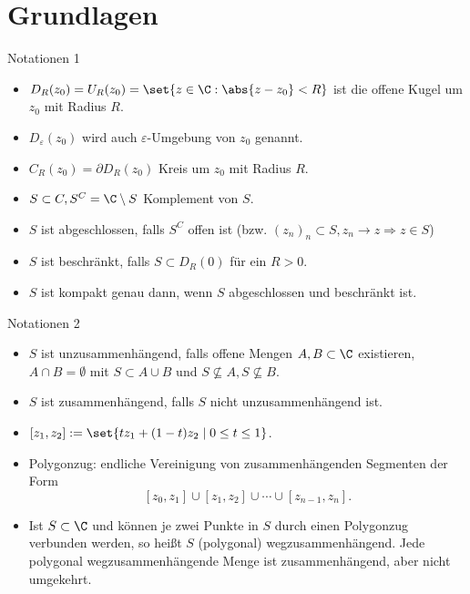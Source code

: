\section{Grundlagen}

\begin{karte}{Notationen 1}
    \begin{itemize}
        \item \(D_R(z_0) = U_R(z_0) = \set{z\in \C : \abs{z-z_0} < R}\) ist 
        die offene Kugel um \(z_0\) mit Radius \(R\).
        \item \(D_\varepsilon(z_0)\) wird auch \(\varepsilon\)-Umgebung von \(z_0\) genannt.
        \item \(C_R(z_0) = \partial D_R(z_0)\) Kreis um \(z_0\) mit Radius \(R\).
        \item \(S \subset C, S^C = \C \setminus S\) Komplement von \(S\).
        \item \(S\) ist abgeschlossen, falls \(S^C\) offen ist (bzw. \((z_n)_n \subset S, z_n \rightarrow z \Rightarrow z\in S\))
        \item \(S\) ist beschränkt, falls \(S \subset D_R(0)\) für ein \(R > 0\).
        \item \(S\) ist kompakt genau dann, wenn \(S\) abgeschlossen und beschränkt ist.
    \end{itemize}
\end{karte}

\begin{karte}{Notationen 2}
    \begin{itemize}
        \item \(S\) ist unzusammenhängend, falls offene Mengen \(A, B \subset \C\) existieren, \(A\cap B = \emptyset\) 
        mit \(S \subset A \cup B\) und \(S \not\subseteq A, S \not \subseteq B\).
        \item \(S\) ist zusammenhängend, falls \(S\) nicht unzusammenhängend ist.
        \item \([z_1, z_2] := \set{t z_1 + (1-t) z_2 \;|\; 0\leq t \leq 1}\).
        \item Polygonzug: endliche Vereinigung von zusammenhängenden Segmenten 
        der Form 
        \[ [z_0, z_1] \cup [z_1, z_2] \cup \cdots \cup [z_{n-1}, z_n]. \]
        \item Ist \(S\subset \C\) und können je zwei Punkte in \(S\) durch 
        einen Polygonzug verbunden werden, so heißt \(S\) 
        (polygonal) wegzusammenhängend. Jede polygonal wegzusammenhängende 
        Menge ist zusammenhängend, aber nicht umgekehrt.
    \end{itemize}
\end{karte}

